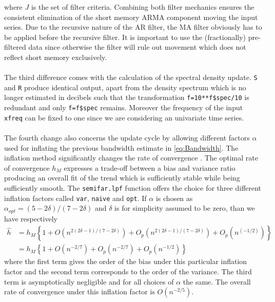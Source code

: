\documentclass[12pt]{article}
\newcommand{\code}[1]{\texttt{#1}}
\begin{document}
where \( J \) is the set of filter criteria. Combining both filter mechanics ensures the consistent elimination of the short memory ARMA component moving the input series. Due to the recursive nature of the AR filter, the MA filter obviously has to be applied before the recursive filter. 
It is important to use the (fractionally) pre-filtered data since otherwise the filter will rule out movement which does not reflect short memory exclusively. \\
\\
The third difference comes with the calculation of the spectral density update. 
\code{S} and \code{R} produce identical output, apart from the density spectrum which is no longer estimated in decibels such that the transformation \code{f=10**f\$spec/10} is redundant and only \code{f=f\$spec} remains.
Moreover the frequency of the input \code{xfreq} can be fixed to one since we are considering an univariate time series.\\
\\
The fourth change also concerns the update cycle by allowing different factors \( \alpha \) used for inflating the previous bandwidth estimate in \eqref{eq:Bandwidth}. The inflation method significantly changes the rate of convergence \parencite{beran2002iterative}.
The optimal rate of convergence \(h_M\) expresses a trade-off between a bias and variance ratio producing an overall fit of the trend which is sufficiently stable while being sufficiently smooth. The \code{semifar.lpf} function offers the choice for three different inflation factors called \code{var}, \code{naive} and \code{opt}.
If \( \alpha \) is chosen as  \(\alpha_{opt} = (5-2\delta)/(7-2\delta)\) and \(\delta\) is for simplicity assumed to be zero, than we have respectively
\begin{equation}
\label{eq:IFopt}
\begin{split}
\hat{h} & = h_M\left\lbrace 1 + O(n^{2(2\delta-1)/(7-2\delta)}) + O_{p}(n^{2(2\delta-1)/(7-2\delta)}) + O_p(n^{(-1/2)}) \right\rbrace \\
& = h_M\left\lbrace 1 + O(n^{-2/7}) + O_{p}(n^{-2/7}) + O_{p}(n^{-1/2}) \right\rbrace
\end{split}
\end{equation}
where the first term gives the order of the bias under this particular inflation factor and the second term corresponds to the order of the variance. The third term is asymptotically negligible and for all choices of \( \alpha \) the same.
The overall rate of convergence under this inflation factor is \(O(n^{-2/5})\).
\end{document}
